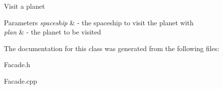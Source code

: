 Visit a planet 
\begin{DoxyParams}{Parameters}
{\em spaceship} & -\/ the spaceship to visit the planet with \\
\hline
{\em plan} & -\/ the planet to be visited \\
\hline
\end{DoxyParams}


The documentation for this class was generated from the following files\+:\begin{DoxyCompactItemize}
\item 
Facade.\+h\item 
Facade.\+cpp\end{DoxyCompactItemize}
